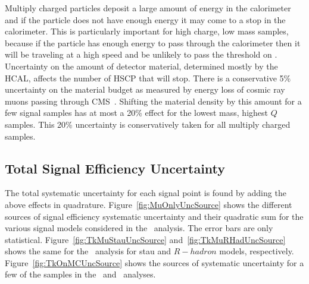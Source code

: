 Multiply charged particles deposit a large amount of energy in the calorimeter and if the particle does not have enough energy it may come to a stop in the calorimeter.
This is particularly important for high charge, low mass samples, because if the particle has enough energy to pass through the calorimeter then it will
be traveling at a high speed and be unlikely to pass the threshold on \invbeta. Uncertainty on the amount of detector material, determined mostly by the
HCAL, affects the number of HSCP that will stop. There is a conservative 5\% uncertainty on the material budget as measured by energy loss of cosmic ray muons
passing through CMS~\cite{Chatrchyan:2009si}. Shifting the material density by this amount for a few signal samples has at most a 20\% effect
for the lowest mass, highest $Q$ samples. This 20\% uncertainty is conservatively taken for all multiply charged samples.

\subsection{Total Signal Efficiency Uncertainty}

The total systematic uncertainty for each signal point is found by adding the above effects in quadrature.
Figure~\ref{fig:MuOnlyUncSource} shows the different sources of signal efficiency systematic uncertainty and their quadratic sum
for the various signal models considered in the \muononly\ analysis. The error bars are only statistical.
Figure~\ref{fig:TkMuStauUncSource} and~\ref{fig:TkMuRHadUncSource} shows the same for the \tktof\ analysis for stau and $R-hadron$ models, respectively.
Figure~\ref{fig:TkOnMCUncSource} shows the sources of systematic uncertainty for a few of the samples in the \tkonly\ and \multi\ analyses.

